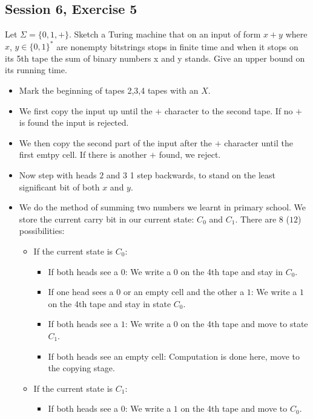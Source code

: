 \subsection {Session 6, Exercise 5}


Let $\Sigma = \{0, 1, +\}$. Sketch a Turing machine that on an input of form $x + y$ where $x$, $y \in \{0, 1\}^*$ are nonempty bitstrings stops in finite time and when it stops on its 5th tape the sum of binary numbers x and y stands. Give an upper bound on its running time.


\begin{itemize}
    \item Mark the beginning of tapes 2,3,4 tapes with an $X$.
    \item We first copy the input up until the $+$ character to the second tape. If no $+$ is found the input is rejected.
    \item We then copy the second part of the input after the $+$ character until the first emtpy cell. If there is another $+$ found, we reject.
    \item Now step with heads $2$ and $3$ 1 step backwards, to stand on the least significant bit of both $x$ and $y$.
    \item We do the method of summing two numbers we learnt in primary school. We store the current carry bit in our current state: $C_0$ and $C_1$. There are $8$ ($12$) possibilities:
    \begin{itemize}
        \item If the current state is $C_0$:
        \begin{itemize}
            \item If both heads see a $0$: We write a $0$ on the 4th tape and stay in $C_0$.
            \item If one head sees a $0$ or an empty cell and the other a $1$: We write a $1$ on the 4th tape and stay in state $C_0$.
            \item If both heads see a $1$: We write a $0$ on the 4th tape and move to state $C_1$.
            \item If both heads see an empty cell: Computation is done here, move to the copying stage.
        \end{itemize}
        \item If the current state is $C_1$:
        \begin{itemize}
            \item If both heads see a $0$: We write a $1$ on the 4th tape and move to $C_0$.

\end{itemize}
\end{itemize}
\end{itemize}
